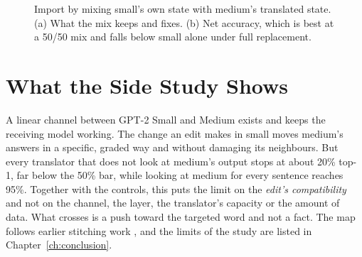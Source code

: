 \begin{figure}[t]
\centering
{}
\caption{Import by mixing small's own state with medium's translated state. (a) What the mix keeps and fixes. (b) Net accuracy, which is best at a 50/50 mix and falls below small alone under full replacement.}\label{fig:import}
\end{figure}

\section{What the Side Study Shows}

A linear channel between GPT-2 Small and Medium exists and keeps the receiving model working. The change an edit makes in small moves medium's answers in a specific, graded way and without damaging its neighbours. But every translator that does not look at medium's output stops at about 20\% top-1, far below the 50\% bar, while looking at medium for every sentence reaches 95\%. Together with the controls, this puts the limit on the \emph{edit's compatibility} and not on the channel, the layer, the translator's capacity or the amount of data. What crosses is a push toward the targeted word and not a fact. The map follows earlier stitching work \cite{r44}, and the limits of the study are listed in Chapter~\ref{ch:conclusion}.
